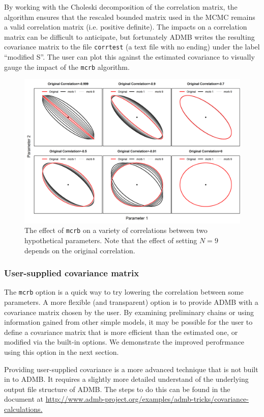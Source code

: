 \documentclass{article}\usepackage[]{graphicx}\usepackage[]{color}
\begin{document}
By working with the Choleski decomposition of the
correlation matrix, the algorithm ensures that the rescaled
bounded matrix used in the MCMC remains a valid correlation
matrix (i.e. positive definite). The impacts on a
correlation matrix can be difficult to anticipate, but
fortunately ADMB writes the resulting covariance matrix to
the file \texttt{corrtest} (a text file with no ending)
under the label ``modified S''. The user can plot this
against the estimated covariance to visually gauge the
impact of the \texttt{mcrb} algorithm.

\begin{figure}[h]
  \centering
  \includegraphics[width=5in]{../plots/mcrb_examples.png}
  \caption{The effect of \texttt{mcrb} on a variety of
    correlations between two hypothetical parameters. Note
    that the effect of setting $N=9$ depends on the original
    correlation.}
  \label{fig:mcrb}
\end{figure}

\subsubsection{User-supplied covariance matrix}
The \texttt{mcrb} option is a quick way to try lowering the
correlation between some parameters. A more flexible (and
transparent) option is to provide ADMB with a covariance
matrix chosen by the user. By examining preliminary chains
or using information gained from other simple models, it may
be possible for the user to define a covariance matrix that
is more efficient than the estimated one, or modified via
the built-in options. We demonstrate the improved
perofrmance using this option in the next section.

Providing user-supplied covariance is a more advanced
technique that is not built in to ADMB. It requires a
slightly more detailed understand of the underlying output
file structure of ADMB. The steps to do this can be found in
the document at
\url{http://www.admb-project.org/examples/admb-tricks/covariance-calculations.}
\end{document}
